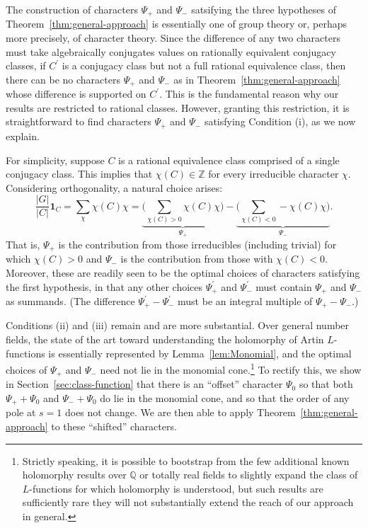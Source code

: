 \documentclass[12pt]{amsart}
\theoremstyle{definition} \newtheorem{definition}[theorem]{Definition}
\theoremstyle{example} \newtheorem{example}[theorem]{Example}
\theoremstyle{remark} \newtheorem{remark}{Remark}[theorem]
\numberwithin{equation}{section}
\numberwithin{theorem}{section}
\begin{document}
	The construction of characters $\Psi_+$ and $\Psi_-$ satsifying the three hypotheses of Theorem~\ref{thm:general-approach} is essentially one of group theory or, perhaps more precisely, of character theory.  Since the difference of any two characters must take algebraically conjugates values on rationally equivalent conjugacy classes, if $C^\prime$ is a conjugacy class but not a full rational equivalence class, then there can be no characters $\Psi_+$ and $\Psi_-$ as in Theorem~\ref{thm:general-approach} whose difference is supported on $C^\prime$.  This is the fundamental reason why our results are restricted to rational classes.  However, granting this restriction, it is straightforward to find characters $\Psi_+$ and $\Psi_-$ satisfying Condition (i), as we now explain.
	
	For simplicity, suppose $C$ is a rational equivalence class comprised of a single conjugacy class.  This implies that $\chi(C) \in \mathbb{Z}$ for every irreducible character $\chi$.  Considering orthogonality, a natural choice arises:
		\[
			\frac{|G|}{|C|} \mathbf{1}_C = \sum_{\chi} \chi(C) \chi =  \underbrace{ \Big(\sum_{\chi(C) > 0}  \chi(C) \chi \Big)}_{\Psi_+} - \underbrace{\Big(\sum_{\chi(C) <  0}  -\chi(C) \chi \Big)}_{\Psi_-}.
		\]
	That is, $\Psi_+$ is the contribution from those irreducibles (including trivial) for which $\chi(C) > 0$ and $\Psi_-$ is the contribution from those with $\chi(C) < 0$.  Moreover, these are readily seen to be the optimal choices of characters satisfying the first hypothesis, in that any other choices $\Psi_+^\prime$ and $\Psi_-^\prime$ must contain $\Psi_+$ and $\Psi_-$ as summands.  (The difference $\Psi_+^\prime - \Psi_-^\prime$ must be an integral multiple of $\Psi_+ - \Psi_-$.)
	
	Conditions (ii) and (iii) remain and are more substantial.  Over general number fields, the state of the art toward understanding the holomorphy of Artin $L$-functions is essentially represented by Lemma~\ref{lem:Monomial}, and the optimal choices of $\Psi_+$ and $\Psi_-$ need not lie in the monomial cone.\footnote{Strictly speaking, it is possible to bootstrap from the few additional known holomorphy results over $\mathbb{Q}$ or totally real fields to slightly expand the class of $L$-functions for which holomorphy is understood, but such results are sufficiently rare they will not substantially extend the reach of our approach in general.}
	To rectify this, we show in Section~\ref{sec:class-function} that there is an ``offset'' character $\Psi_0$ so that both $\Psi_+ + \Psi_0$ and $\Psi_- + \Psi_0$ do lie in the monomial cone, and so that the order of any pole at $s=1$ does not change.  We are then able to apply Theorem~\ref{thm:general-approach} to these ``shifted'' characters.
	
\end{document}
